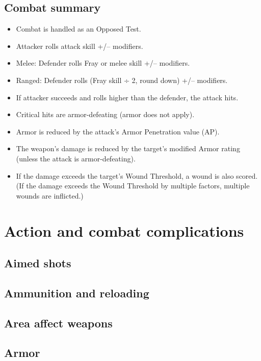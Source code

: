 \subsection{Combat summary}

\begin{itemize}
\item Combat is handled as an Opposed Test.
\item Attacker rolls attack skill +/– modifiers.
\item Melee: Defender rolls Fray or melee skill +/– modifiers.
\item Ranged: Defender rolls (Fray skill ÷ 2, round down) +/– modifiers.
\item If attacker succeeds and rolls higher than the defender, the attack hits.
\item Critical hits are armor-defeating (armor does not apply).
\item Armor is reduced by the attack’s Armor Penetration value (AP).
\item The weapon’s damage is reduced by the target’s modified Armor rating (unless the attack is armor-defeating).
\item If the damage exceeds the target’s Wound Threshold, a wound is also scored. (If the damage exceeds the Wound Threshold by multiple factors, multiple wounds are inflicted.)
\end{itemize}


\section{Action and combat complications}
\label{sec:action-combat-comp}

\subsection{Aimed shots}

\subsection{Ammunition and reloading}

\subsection{Area affect weapons}

\subsection{Armor}

